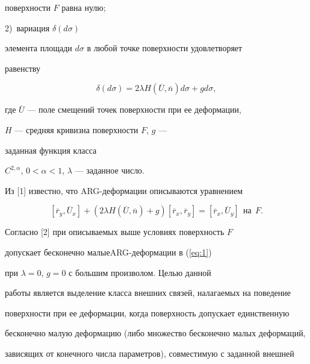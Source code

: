 поверхности $F$ равна нулю;





2)~вариация $\delta ({d\sigma })$


элемента площади $d\sigma$ в любой точке поверхности удовлетворяет 


равенству


\begin{equation}\label{eq:1}


\delta ({d\sigma })=2\lambda


H({\overline U ,\overline n })d\sigma+gd\sigma,


\end{equation}


где $\overline U $ --- поле смещений точек поверхности при ее деформации,


$H$ --- средняя кривизна поверхности $F$, $g$ ---


заданная функция класса


$C^{2,\alpha }$, $0 < \alpha < 1$, $\lambda$ --- заданное число.





Из [1] известно, что ARG-деформации описываются уравнением


\begin{equation}\label{eq:2}


[ {\overline r _y ,\overline U _x }]+({2\lambda H (


{\overline U ,\overline n })+g}) [ {\overline r _x ,


\overline r _y } ]=[ {\overline r _x ,\overline U _y } ]


\ \ \text{на}\ \ F.


\end{equation}


Согласно [2] при описываемых выше условиях поверхность $F$


допускает бесконечно малые\linebreak ARG-деформации в (\ref{eq:1})


при $\lambda=0$, $g=0$ с большим произволом. Целью данной


работы является выделение класса внешних связей, налагаемых на поведение 


поверхности при ее деформации, когда поверхность допускает единственную 


бесконечно малую деформацию (либо множество бесконечно малых деформаций, 


зависящих от конечного числа параметров), совместимую с заданной внешней 


